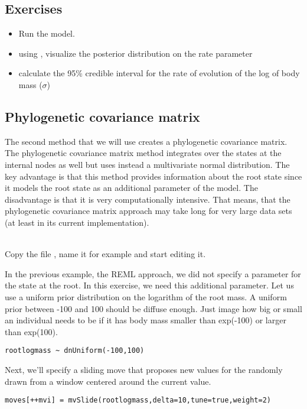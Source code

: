 \subsection*{Exercises}

\begin{itemize}
\item
Run the model.
\item
using , visualize the posterior distribution on the rate parameter 
\item
calculate the 95\% credible interval for the rate of evolution of the log of body mass ($\sigma$)
\end{itemize}


\vspace{5cm}






\subsection{Phylogenetic covariance matrix}

The second method that we will use creates a phylogenetic covariance matrix. The phylogenetic covariance matrix method integrates over the states  at the internal nodes as well but uses instead a multivariate normal distribution.
The key advantage is that this method provides information about the root state since it models the root state as an additional parameter of the model. The disadvantage is that it is very computationally intensive. That means, that the phylogenetic covariance matrix approach may take long for very large data sets (at least in its current implementation).

\noindent \\ \impmark Copy the file , name it for example  and start editing it.

In the previous example, the REML approach, we did not specify a parameter for the state at the root.
In this exercise, we need this additional parameter.
Let us use a uniform prior distribution on the logarithm of the root mass.
A uniform prior between -100 and 100 should be diffuse enough. Just image how big or small an individual needs to be if it has body mass smaller than exp(-100) or larger than exp(100).
{\tt \small \begin{snugshade*}
\begin{lstlisting}
rootlogmass ~ dnUniform(-100,100)
\end{lstlisting}
\end{snugshade*}}
Next, we'll specify a sliding move that proposes new values for the  randomly drawn from a window centered around the current value.
{\tt \small \begin{snugshade*}
\begin{lstlisting}
moves[++mvi] = mvSlide(rootlogmass,delta=10,tune=true,weight=2) 
\end{lstlisting}
\end{snugshade*}}

